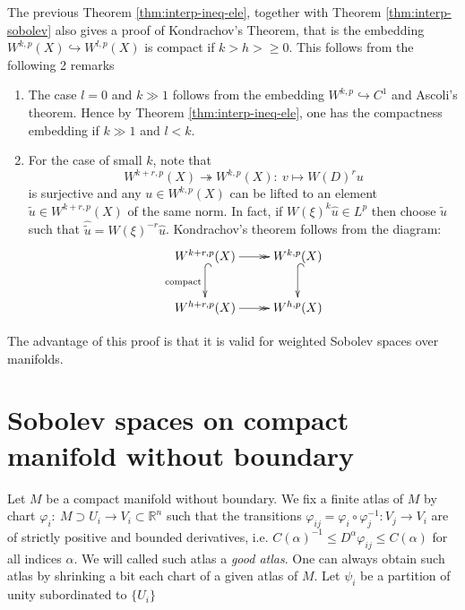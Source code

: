 The previous Theorem \ref{thm:interp-ineq-ele}, together with Theorem \ref{thm:interp-sobolev}
also gives a proof of Kondrachov's Theorem, that is the embedding \(W^{k,p}(X)
\hookrightarrow  W^{l,p}(X)\) is compact if \(k>h>\geq 0\). This follows from the
following 2 remarks
\begin{enumerate}
\item The case \(l=0\) and \(k\gg 1\) follows from the embedding \(W^{k,p}
   \hookrightarrow C^1\) and Ascoli's theorem. Hence by Theorem \ref{thm:interp-ineq-ele},
one has the compactness embedding if \(k \gg 1\) and \(l<k\).
\item For the case of small \(k\), note that 
\[ 
   W^{k+r,p}(X) \twoheadrightarrow W^{k,p}(X):\ v \longmapsto W(D)^r u 
   \]
is surjective and any \(u\in W^{k,p}(X)\) can be lifted to an element \(\tilde u\in
   W^{k+r,p}(X)\) of the same norm. In fact, if \(W(\xi)^k \hat u \in L^p\) then choose
\(\tilde u\) such that \(\widehat{\tilde u} = W(\xi)^{-r} \hat u\). Kondrachov's
theorem follows from the diagram:
\[
    \xymatrix{
    W^{k+r,p}(X) \ar@{->>}[r] \ar@{^{(}->}[d]_{\rm compact} & W^{k,p}(X) \ar@{^{(}->}[d] \\
    W^{h+r,p}(X) \ar@{->>}[r] & W^{h,p}(X)
    }
   \]
\end{enumerate}

\begin{remark}
The advantage of this proof is that it is valid for weighted Sobolev spaces over manifolds.
\end{remark}

\section{Sobolev spaces on compact manifold without boundary}
\label{sec:orgb45ccd2}
Let \(M\) be a compact manifold without boundary. We fix a finite atlas of \(M\) by
chart \(\varphi_i:\ M\supset U_i \longrightarrow V_i \subset \mathbb{R}^n\) such that
the transitions \(\varphi_{ij}=\varphi_i \circ \varphi_j^{-1}: V_j \longrightarrow V_i\)
are of strictly positive and bounded derivatives, i.e. \(C(\alpha)^{-1}\leq D^\alpha
\varphi_{ij}\leq C(\alpha)\) for all indices \(\alpha\). We will called such atlas a
\emph{good atlas}. 
One can always obtain such atlas by shrinking a bit each chart of a given atlas of \(M\). Let \(\psi_i\) be a
partition of unity subordinated to \(\{U_i\}\)


